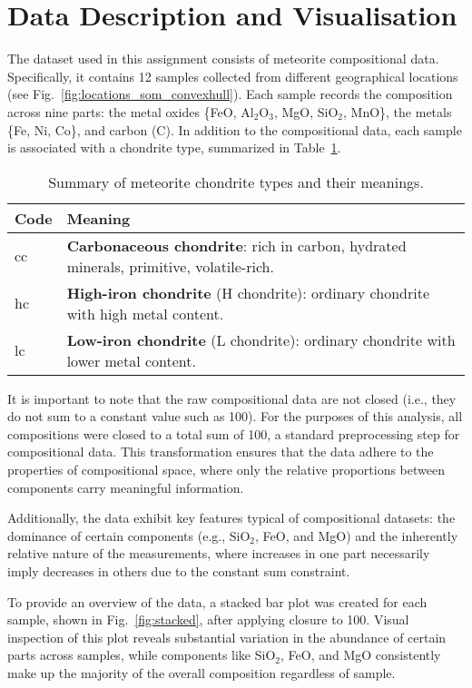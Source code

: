 \section{Data Description and Visualisation}

The dataset used in this assignment consists of meteorite compositional data. Specifically, it contains 12 samples collected from different geographical locations (see Fig.~\ref{fig:locations_som_convexhull}). Each sample records the composition across nine parts: the metal oxides \{FeO, Al$_2$O$_3$, MgO, SiO$_2$, MnO\}, the metals \{Fe, Ni, Co\}, and carbon (C). In addition to the compositional data, each sample is associated with a chondrite type, summarized in Table~\ref{tab:chondrite-types}.

\begin{table}[H]
\centering
\begin{tabular}{@{}ll@{}}
\toprule
\textbf{Code} & \textbf{Meaning} \\ \midrule
cc & \textbf{Carbonaceous chondrite}: rich in carbon, hydrated minerals, primitive, volatile-rich. \\
hc & \textbf{High-iron chondrite} (H chondrite): ordinary chondrite with high metal content. \\
lc & \textbf{Low-iron chondrite} (L chondrite): ordinary chondrite with lower metal content. \\ \bottomrule
\end{tabular}
\caption{Summary of meteorite chondrite types and their meanings.}
\label{tab:chondrite-types}
\end{table}

It is important to note that the raw compositional data are not closed (i.e., they do not sum to a constant value such as 100). For the purposes of this analysis, all compositions were closed to a total sum of 100, a standard preprocessing step for compositional data. This transformation ensures that the data adhere to the properties of compositional space, where only the relative proportions between components carry meaningful information.

Additionally, the data exhibit key features typical of compositional datasets: the dominance of certain components (e.g., SiO$_2$, FeO, and MgO) and the inherently relative nature of the measurements, where increases in one part necessarily imply decreases in others due to the constant sum constraint.

To provide an overview of the data, a stacked bar plot was created for each sample, shown in Fig.~\ref{fig:stacked}, after applying closure to 100. Visual inspection of this plot reveals substantial variation in the abundance of certain parts across samples, while components like SiO$_2$, FeO, and MgO consistently make up the majority of the overall composition regardless of sample.

